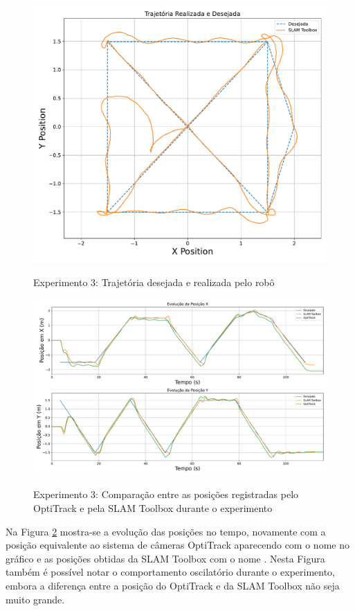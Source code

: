 \begin{figure}[htb]
    \centering
    \caption{Experimento 3: Trajetória desejada e realizada pelo robô}
    \includegraphics[width=0.7\linewidth]{img/Resultados/Exp3_SLAM_Control_LINEAR/trajetoria.pdf}
    \source
    \label{fig:Exp3_Trajetoria}
\end{figure}

\begin{figure}[htb]
    \centering
    \caption{Experimento 3: Comparação entre as posições registradas pelo OptiTrack e pela SLAM Toolbox durante o experimento}
    \includegraphics[width=\linewidth]{img/Resultados/Exp3_SLAM_Control_LINEAR/pose_tempo.pdf}
    \source
    \label{fig:Exp3_Posicao_Tempo}
\end{figure}


Na Figura \ref{fig:Exp3_Posicao_Tempo} mostra-se a evolução das posições no tempo, novamente com a posição equivalente ao sistema de câmeras OptiTrack aparecendo com o nome  no gráfico e as posições obtidas da SLAM Toolbox com o nome . Nesta Figura também é possível notar o comportamento oscilatório durante o experimento, embora a diferença entre a posição do OptiTrack e da SLAM Toolbox não seja muito grande.



